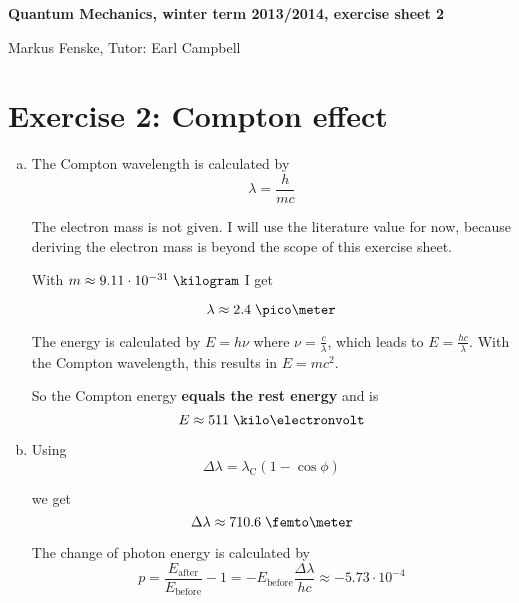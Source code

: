 \documentclass[a4paper,german,12pt,smallheadings]{scrartcl}
\begin{document}
\begin{center}
\bfseries %
\sffamily %
\vspace{-40pt}
Quantum Mechanics, winter term 2013/2014, exercise sheet 2

Markus Fenske, Tutor: Earl Campbell
\vspace{-10pt}
\end{center}

\section*{Exercise 2: Compton effect}

\begin{enumerate}[a)]
  \item
    The Compton wavelength is calculated by
    \begin{equation*}
      \lambda = \frac{h}{mc}
    \end{equation*}

    The electron mass is not given. I will use the literature value for now,
    because deriving the electron mass is beyond the scope of this exercise
    sheet.

    With $m \approx 9.11 \cdot 10^{-31} \; \kilogram$ I get

    \begin{equation*}
      \lambda \approx 2.4 \; \pico\meter
    \end{equation*}

    The energy is calculated by $E = h \nu$ where $\nu = \frac{c}{\lambda}$,
    which leads to $E = \frac{hc}{\lambda}$. With the Compton wavelength, this
    results in $E=mc^2$.

    So the Compton energy \textbf{equals the rest energy} and is
    \begin{equation*}
      E \approx 511 \; \kilo\electronvolt
    \end{equation*}

  \item
    Using
    \begin{equation*}
      \Delta \lambda = \lambda_{\text{C}} \left( 1 - \cos \phi \right)
    \end{equation*}

    we get
    \begin{equation*}
      \Delta \lambda \approx 710.6 \; \femto\meter
    \end{equation*}

    The change of photon energy is calculated by
    \begin{equation*}
      p = \frac{E_\text{after}}{E_\text{before}} - 1 = - E_{\text{before}} \frac{\Delta\lambda}{hc} \approx - 5.73 \cdot 10^{-4}
    \end{equation*}


\end{enumerate}
\end{document}
